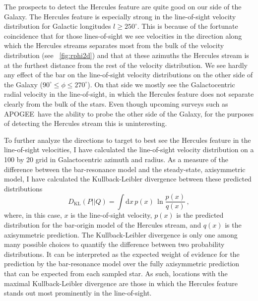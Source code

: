 \documentclass[12pt,preprint]{aastex}
\newcommand{\eg}{e.g.}
\newcommand{\dd}{\mathrm{d}}
\newcommand{\apogee}{APOGEE}
\begin{document}
The prospects to detect the Hercules feature are quite good on our
side of the Galaxy. The Hercules feature is especially strong in the
line-of-sight velocity distribution for Galactic longitudes $l \geq
250^{\circ}$. This is because of the fortunate coincidence that for
those lines-of-sight we see velocities in the direction along which
the Hercules streams separates most from the bulk of the velocity
distribution (see \figurename~\ref{fig:rphi2d}) and that at these
azimuths the Hercules stream is at the furthest distance from the rest
of the velocity distribution. We see hardly any effect of the bar on
the line-of-sight velocity distributions on the other side of the
Galaxy ($90^{\circ} \leq \phi \leq 270^{\circ}$). On that side we
mostly see the Galactocentric radial velocity in the line-of-sight, in
which the Hercules feature does not separate clearly from the bulk of
the stars. Even though upcoming surveys such as \apogee\ have the
ability to probe the other side of the Galaxy, for the purposes of
detecting the Hercules stream this is uninteresting.

To further analyze the directions to target to best see the Hercules
feature in the line-of-sight velocities, I have calculated the
line-of-sight velocity distribution on a 100 by 20 grid in
Galactocentric azimuth and radius. As a measure of the difference
between the bar-resonance model and the steady-state, axisymmetric
model, I have calculated the Kullback-Leibler divergence between these
predicted distributions \citep[\eg,][]{mackay}
\begin{equation}
D_{\text{KL}}(P||Q) = \int \dd x\,p(x)\,\ln \frac{p(x)}{q(x)}\,,
\end{equation}
where, in this case, $x$ is the line-of-sight velocity, $p(x)$ is the
predicted distribution for the bar-origin model of the Hercules
stream, and $q(x)$ is the axisymmetric prediction. The
Kullback-Leibler divergence is only one among many possible choices to
quantify the difference between two probability distributions. It can
be interpreted as the expected weight of evidence for the prediction
by the bar-resonance model over the fully axisymmetric prediction that
can be expected from each sampled star. As such, locations with the
maximal Kullback-Leibler divergence are those in which the Hercules
feature stands out most prominently in the line-of-sight.
\end{document}
